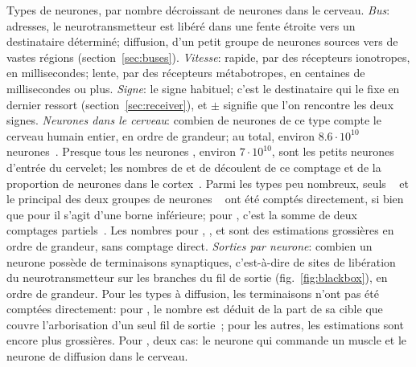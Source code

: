 \begin{table}[t]
\caption{Types de neurones, par nombre décroissant de neurones dans le cerveau. \emph{Bus}: adresses, le neurotransmetteur est libéré dans une fente étroite vers un destinataire déterminé; diffusion, d'un petit groupe de neurones sources vers de vastes régions (section~\ref{sec:buses}). \emph{Vitesse}: rapide, par des récepteurs ionotropes, en millisecondes; lente, par des récepteurs métabotropes, en centaines de millisecondes ou plus. \emph{Signe}: le signe habituel; c'est le destinataire qui le fixe en dernier ressort (section~\ref{sec:receiver}), et $\pm$ signifie que l'on rencontre les deux signes. \emph{Neurones dans le cerveau}: combien de neurones de ce type compte le cerveau humain entier, en ordre de grandeur; au total, environ $8.6\cdot10^{10}$ neurones~\cite{Azevedo2009}. Presque tous les neurones , environ $7\cdot10^{10}$, sont les petits neurones d'entrée du cervelet; les nombres de  et de  découlent de ce comptage et de la proportion de neurones  dans le cortex~\cite{Hendry1987}. Parmi les types peu nombreux, seuls ~\cite{Airaksinen1991} et le principal des deux groupes de neurones ~\cite{Pakkenberg1991} ont été comptés directement, si bien que pour  il s'agit d'une borne inférieure; pour , c'est la somme de deux comptages partiels~\cite{Baker1990,Baker1991}. Les nombres pour , ,  et  sont des estimations grossières en ordre de grandeur, sans comptage direct. \emph{Sorties par neurone}: combien un neurone possède de terminaisons synaptiques, c'est-à-dire de sites de libération du neurotransmetteur sur les branches du fil de sortie (fig.~\ref{fig:blackbox}), en ordre de grandeur. Pour les types à diffusion, les terminaisons n'ont pas été comptées directement: pour , le nombre est déduit de la part de sa cible que couvre l'arborisation d'un seul fil de sortie~\cite{Matsuda2009}; pour les autres, les estimations sont encore plus grossières. Pour , deux cas: le neurone qui commande un muscle et le neurone de diffusion dans le cerveau.}
\label{tab:types}
\end{table}

